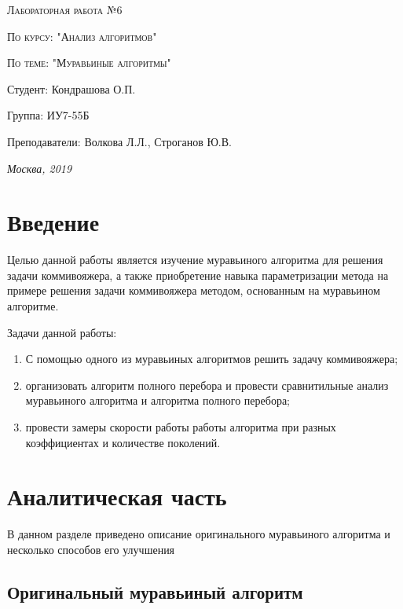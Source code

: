 \documentclass[a4paper, 14pt]{article}
\begin{document}
\begin{titlepage}
	\centering
	{\scshape\Large Лабораторная работа №6\par}
	{\scshape\Large По курсу: "Анализ алгоритмов"\par}
	{\scshape\Large По теме: "Муравьиные алгоритмы"\par}
	\vspace{7cm}
	\Large Студент: Кондрашова О.П.\par
	\Large Группа: ИУ7-55Б\par
	\Large Преподаватели:  Волкова Л.Л., Строганов Ю.В.\par

	\vfill
	\large \textit {Москва, 2019} \par
	\end{titlepage}
	
	\setcounter{page}{2}
	\tableofcontents
	
	\newpage
	\section*{Введение}
	
	
		 Целью данной работы является изучение муравьиного алгоритма для решения задачи коммивояжера, а также приобретение навыка параметризации метода на примере решения задачи коммивояжера методом, основанным на муравьином алгоритме.
		 
		 Задачи данной работы:
	
\begin{enumerate}
\item С помощью одного из муравьиных алгоритмов решить задачу коммивояжера;
\item организовать алгоритм полного перебора и провести сравнитильные анализ муравьиного алгоритма и алгоритма полного перебора;
\item провести замеры скорости работы работы алгоритма при разных коэффициентах и количестве поколений.
\end{enumerate}

	\newpage
\section{Аналитическая часть}
\hspace{1cm}	В данном разделе приведено описание оригинального муравьиного алгоритма и несколько способов его улучшения

\subsection {Оригинальный муравьиный алгоритм} 
\end{document}
